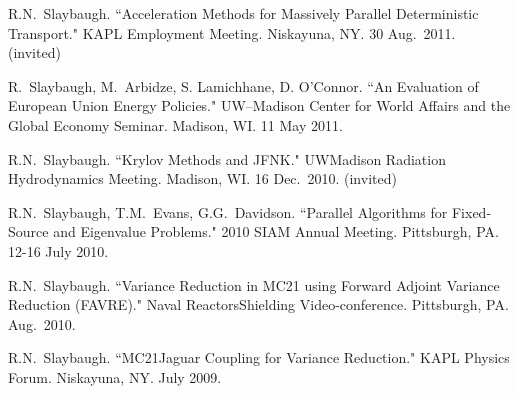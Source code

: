 \begin{bibsection}
\item R.N.\ Slaybaugh. ``Acceleration Methods for Massively Parallel Deterministic Transport." KAPL Employment Meeting. Niskayuna, NY. 30 Aug.\ 2011. (invited)

\item R.\ Slaybaugh, M.\ Arbidze, S. Lamichhane, D. O'Connor. ``An Evaluation of European Union Energy Policies." UW--Madison Center for World Affairs and the Global Economy Seminar. Madison, WI. 11 May 2011.

\item R.N.\ Slaybaugh. ``Krylov Methods and JFNK." UW\textemdash Madison Radiation Hydrodynamics Meeting. Madison, WI. 16 Dec.\ 2010. (invited)

\item R.N.\ Slaybaugh, T.M.\ Evans, G.G.\ Davidson. ``Parallel Algorithms for Fixed-Source and Eigenvalue Problems." 2010 SIAM Annual Meeting. Pittsburgh, PA. 12-16 July 2010.

\item R.N.\ Slaybaugh. ``Variance Reduction in MC21 using Forward Adjoint Variance Reduction (FAVRE)." Naval Reactors\textemdash Shielding Video-conference. Pittsburgh, PA. Aug.\ 2010.

\item R.N.\ Slaybaugh. ``MC21\textemdash Jaguar Coupling for Variance Reduction." KAPL Physics Forum. Niskayuna, NY. July 2009.

\end{bibsection}


